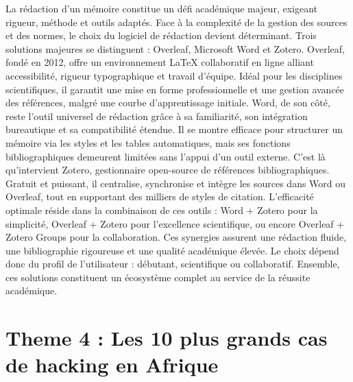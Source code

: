 \documentclass[12pt]{article}
\begin{document}
La rédaction d’un mémoire constitue un défi académique majeur, exigeant rigueur, méthode et outils adaptés. Face à la complexité de la gestion des sources et des normes, le choix du logiciel de rédaction devient déterminant. Trois solutions majeures se distinguent : Overleaf, Microsoft Word et Zotero.
Overleaf, fondé en 2012, offre un environnement LaTeX collaboratif en ligne alliant accessibilité, rigueur typographique et travail d’équipe. Idéal pour les disciplines scientifiques, il garantit une mise en forme professionnelle et une gestion avancée des références, malgré une courbe d’apprentissage initiale. Word, de son côté, reste l’outil universel de rédaction grâce à sa familiarité, son intégration bureautique et sa compatibilité étendue. Il se montre efficace pour structurer un mémoire via les styles et les tables automatiques, mais ses fonctions bibliographiques demeurent limitées sans l’appui d’un outil externe. C’est là qu’intervient Zotero, gestionnaire open-source de références bibliographiques. Gratuit et puissant, il centralise, synchronise et intègre les sources dans Word ou Overleaf, tout en supportant des milliers de styles de citation. L’efficacité optimale réside dans la combinaison de ces outils : Word + Zotero pour la simplicité, Overleaf + Zotero pour l’excellence scientifique, ou encore Overleaf + Zotero Groups pour la collaboration. Ces synergies assurent une rédaction fluide, une bibliographie rigoureuse et une qualité académique élevée. Le choix dépend donc du profil de l’utilisateur : débutant, scientifique ou collaboratif. Ensemble, ces solutions constituent un écosystème complet au service de la réussite académique.


\section{Theme 4 : Les 10 plus grands cas de hacking en Afrique}
\end{document}

